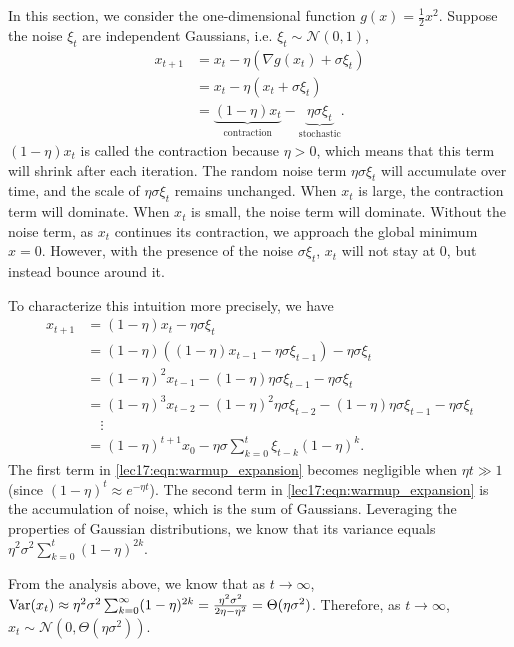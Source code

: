 In this section, we consider the one-dimensional function $g(x) = \frac{1}{2} x^2$. Suppose the noise $\xi_t$ are independent Gaussians, i.e. $\xi_t \sim \mathcal{N}(0,1)$,
\begin{align}
x_{t+1} &= x_t - \eta(\nabla g(x_{t}) + \sigma\xi_t)\\
&= x_t - \eta(x_{t} + \sigma\xi_t)\\
&= \underbrace{(1 - \eta)x_t}_{\text{contraction}} - \underbrace{\eta\sigma\xi_t}_{\text{stochastic}}\label{lec17:eqn:ou}.
\end{align}
$(1 - \eta)x_t$ is called the contraction because $\eta > 0$, which means that this term will shrink after each iteration. The random noise term $\eta\sigma\xi_t$ will accumulate over time, and the scale of $\eta\sigma\xi_t$ remains unchanged. When $x_t$ is large, the contraction term will dominate. When $x_t$ is small, the noise term will dominate. Without the noise term, as $x_t$ continues its contraction, we approach the global minimum $x = 0$. However, with the presence of the noise $\sigma\xi_t$, $x_t$ will not stay at $0$, but instead bounce around it. 

To characterize this intuition more precisely, we have 
\begin{align}
x_{t+1} &= (1 - \eta)x_t - \eta\sigma\xi_t\\
&= (1 - \eta) ((1 - \eta) x_{t - 1}  - \eta \sigma \xi_{t - 1}) - \eta \sigma \xi_t \\
&= (1 - \eta)^2 x_{t - 1} - (1 - \eta) \eta \sigma \xi_{t - 1} - \eta \sigma \xi_{t} \\
&= (1 - \eta)^3 x_{t - 2} - (1 - \eta)^2 \eta \sigma \xi_{t - 2} - (1 - \eta) \eta \sigma \xi_{t - 1} - \eta \sigma \xi_t \\
&\quad \vdots \\
&= (1 - \eta)^{t+1} x_0 - \eta\sigma\sum_{k=0}^{t} \xi_{t-k} (1 - \eta)^{k}. \label{lec17:eqn:warmup_expansion}
\end{align}
The first term in \eqref{lec17:eqn:warmup_expansion} becomes negligible when $\eta t \gg 1$ (since $(1 - \eta)^{t} \approx e^{-\eta t}$). The second term in \eqref{lec17:eqn:warmup_expansion} is the accumulation of noise, which is the sum of Gaussians. Leveraging the properties of Gaussian distributions, we know that its variance equals $\eta^2\sigma^2\sum_{k=0}^{t} (1 - \eta)^{2k}$.

From the analysis above, we know that as $t \rightarrow \infty$, $\operatorname{Var}(x_t) \approx \eta^2\sigma^2\sum_{k=0}^{\infty} (1 - \eta)^{2k} = \frac{\eta^2\sigma^2}{2\eta - \eta^2} = {\Theta}(\eta\sigma^2)$. Therefore, as $t \rightarrow \infty$, $x_t \sim \mathcal{N}(0, {\Theta}(\eta\sigma^2))$.

